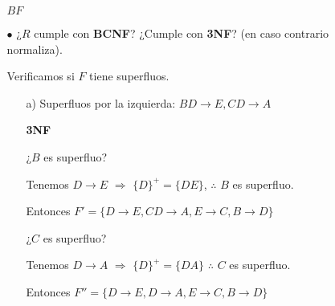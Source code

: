 \documentclass[12pt, letterpaper]{article}
\begin{document}
\begin{itemize}
\begin{itemize}
                                        \begin{center}
                                            $BF$    
                                        \end{center}

                    \item[$\bullet$]    ¿$R$ cumple con \textbf{BCNF}? ¿Cumple 
                                        con \textbf{3NF}? (en caso contrario 
                                        normaliza).

                                        Verificamos si $F$ tiene superfluos.\vspace{.2cm}

                                        \begin{itemize}
                                            \item[a)] Superfluos por la izquierda: $BD\rightarrow E,CD\rightarrow A$\vspace{.2cm}
                                            
                                                     \textbf{3NF}\vspace{.2cm}

                                                      ¿$B$ es superfluo?\vspace{.1cm}

                                                      Tenemos $D\rightarrow E$ $\Rightarrow$ $\{D\}^+=\{DE\}$, $\therefore$ $B$ es superfluo.\vspace{.2cm}

                                                      Entonces $F'=\{D \rightarrow E, CD \rightarrow A, E \rightarrow C, B\rightarrow D\}$\vspace{.3cm}

                                                      ¿$C$ es superfluo?\vspace{.1cm}

                                                      Tenemos $D\rightarrow A$ $\Rightarrow$ $\{D\}^+=\{DA\}$ $\therefore$ $C$ es superfluo.\vspace{.2cm}

                                                      Entonces $F''=\{D \rightarrow E,
                                                      D \rightarrow A, E \rightarrow C, B\rightarrow D\}$\vspace{.3cm}


\end{itemize}
\end{itemize}
\end{itemize}
\end{document}
